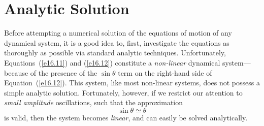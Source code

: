 \section{Analytic Solution}\label{s5.2}
Before attempting a numerical solution of the equations of motion of any dynamical system, it is a good idea to, first, investigate the equations as thoroughly as possible via standard analytic techniques. 
Unfortunately, Equations~(\ref{e16.11}) and (\ref{e16.12}) constitute a {\em non-linear}\/ dynamical
system---because of the presence of the $\sin\theta$ term on the right-hand side of
Equation~(\ref{e16.12}). This system, like most non-linear systems, does not possess a simple
analytic solution. Fortunately, however, if we restrict our attention to {\em small amplitude}\/ oscillations,
such that the approximation
\begin{equation}
\sin\theta \simeq \theta
\end{equation}
is valid,
then the system becomes {\em linear}, and can easily be solved analytically.

